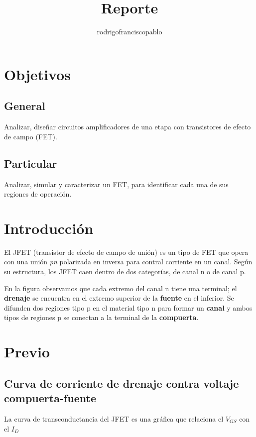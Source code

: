 \documentclass{mylib/reporteConCalif}
\title{Reporte}
\author{rodrigofranciscopablo }
\begin{document}
\coverPage


\section{Objetivos}

\subsection{General}

Analizar, diseñar circuitos amplificadores de una etapa con transistores de efecto de campo (FET).

\subsection{Particular}

Analizar, simular y caracterizar un FET, para identificar cada una de sus regiones de operación.

\section{Introducción}

El JFET (transistor de efecto de campo de unión) es un tipo de FET que opera con una unión \textit{pn} polarizada en inversa para contral corriente en un canal. Según su estructura, los JFET caen dentro de dos categorías, de canal n o de canal p.


En la figura observamos que cada extremo del canal n tiene una terminal; el \textbf{drenaje} se encuentra en el extremo superior de la \textbf{fuente} en el inferior. Se difunden dos regiones tipo p en el material tipo n para formar un \textbf{canal} y ambos tipos de regiones p se conectan a la terminal de la \textbf{compuerta}.


\newpage
\section{Previo}

\subsection{Curva de corriente de drenaje contra voltaje compuerta-fuente}

La curva de transconductancia del JFET es una gráfica que relaciona el $V_{GS}$ con el $I_D$
\end{document}
